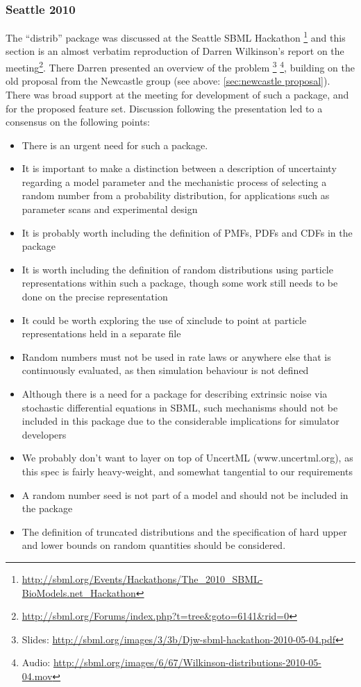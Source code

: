 \documentclass[draftspec]{sbmlpkgspec}
\newcommand{\uncertml}{UncertML\xspace}
\begin{document}
\subsubsection{Seattle 2010}

The ``distrib'' package was discussed at the Seattle SBML Hackathon%
\footnote{\url{http://sbml.org/Events/Hackathons/The_2010_SBML-BioModels.net_Hackathon}}
and this section is an almost verbatim reproduction of Darren
Wilkinson's report on the
meeting\footnote{\url{http://sbml.org/Forums/index.php?t=tree\&goto=6141\&rid=0}}. There
Darren presented an overview of the problem%
\footnote{Slides: \url{http://sbml.org/images/3/3b/Djw-sbml-hackathon-2010-05-04.pdf}}%
\footnote{Audio: \url{http://sbml.org/images/6/67/Wilkinson-distributions-2010-05-04.mov}},
building on the old proposal from the Newcastle group (see above:
\ref{sec:newcastle proposal}).  There was broad support at the meeting
for development of such a package, and for the proposed feature
set. Discussion following the presentation led to a consensus on the
following points:

\begin{itemize}
\item There is an urgent need for such a package.
\item It is important to make a distinction between a description of
  uncertainty regarding a model parameter and the mechanistic process
  of selecting a random number from a probability distribution, for
  applications such as parameter scans and experimental design
\item It is probably worth including the definition of PMFs, PDFs and CDFs in the package
\item It is worth including the definition of random distributions using particle representations within such a package, though some work
 still needs to be done on the precise representation
\item It could be worth exploring the use of xinclude to point at particle
representations held in a separate file
\item Random numbers must not be used in rate laws or anywhere else that
 is continuously evaluated, as then simulation behaviour is not
 defined
\item Although there is a need for a package for describing extrinsic
 noise via stochastic differential equations in SBML, such mechanisms
 should not be included in this package due to the considerable
 implications for simulator developers
\item We probably don't want to layer on top of \uncertml
 (www.uncertml.org), as this spec is fairly heavy-weight, and
 somewhat tangential to our requirements
\item A random number seed is not part of a model and should not be
 included in the package
\item The definition of truncated distributions and the specification of
 hard upper and lower bounds on random quantities should be
 considered.
\end{itemize}
\end{document}

